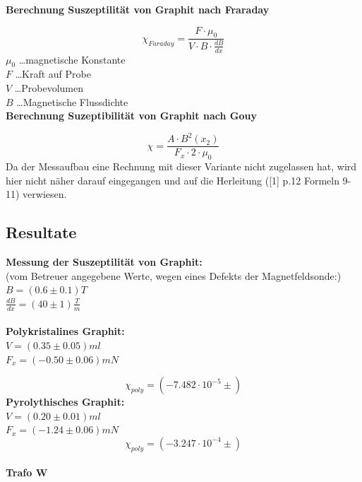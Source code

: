 \documentclass[12pt,a4paper]{article}
\begin{document}
\begin{multicols}{2}

\textbf{Berechnung Suszeptilität von Graphit nach Fraraday}

$$\chi_{Faraday} = \frac{F \cdot \mu_0}{V \cdot B \cdot \frac{dB}{dx}}$$
$\mu_0$ \ldots magnetische Konstante\\
$F$ \ldots Kraft auf Probe\\
$V$ \ldots Probevolumen\\
$B$ \ldots Magnetische Flussdichte\\

\noindent
\textbf{Berechnung Suzeptibilität von Graphit nach Gouy}

$$\chi = \frac{A \cdot B^2(x_2)}{F_x \cdot 2 \cdot \mu_{0}} $$
Da der Messaufbau eine Rechnung mit dieser Variante nicht zugelassen hat, wird hier nicht näher darauf eingegangen und auf die Herleitung ([1] p.12 Formeln 9-11) verwiesen.

\subsection{Resultate}
\textbf{Messung der Suszeptilität von Graphit:}\\
(vom Betreuer angegebene Werte, wegen eines Defekts der Magnetfeldsonde:)\\
$B = (0.6 \pm 0.1)T$\\
$\frac{dB}{dx} = (40 \pm 1) \frac{T}{m}$\\
\\
\textbf{Polykristalines Graphit:}\\
$V=(0.35 \pm 0.05) ml$\\
$F_x=(-0.50 \pm 0.06)mN$


$$\chi_{poly} = (-7.482 \cdot 10^{-5} \pm )$$
\textbf{Pyrolythisches Graphit:}\\
$V=(0.20 \pm 0.01) ml$\\
$F_x=(-1.24 \pm 0.06)mN$
$$\chi_{poly} = (-3.247 \cdot 10^{-4} \pm )$$
\\
\noindent
\textbf{Trafo W}\\

\end{multicols}
\end{document}
